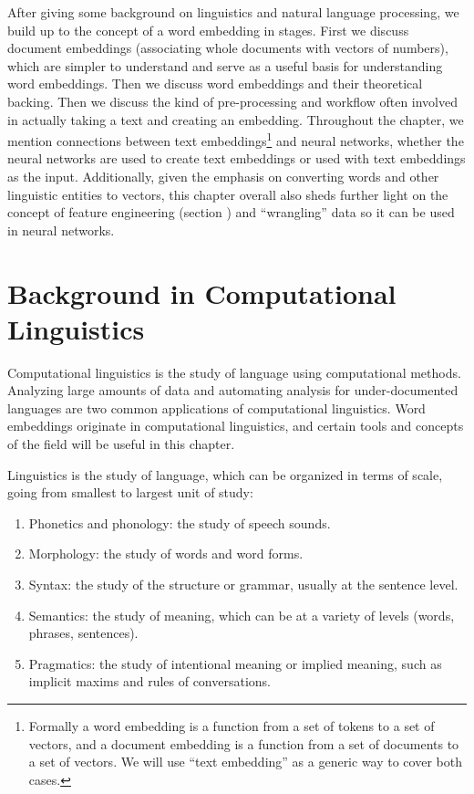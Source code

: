 After giving some background on linguistics and natural language processing, we build up to the concept of a word embedding in stages. First we discuss document embeddings (associating whole documents with vectors of numbers), which are simpler to understand and serve as a useful basis for understanding word embeddings. Then we discuss word embeddings and their theoretical backing.  Then we discuss the kind of pre-processing and workflow often involved in actually taking a text and creating an embedding. Throughout the chapter, we mention connections between text embeddings\footnote{Formally a word embedding is a function from a set of tokens to a set of vectors, and a document embedding is a function from a set of documents to a set of vectors.  We will use ``text embedding'' as a generic way to cover both cases.} and neural networks, whether the neural networks are used to create text embeddings or used with text embeddings as the input.
Additionally, given the emphasis on converting words and other linguistic entities to vectors, this chapter overall also sheds further light on the concept of feature engineering (section ) and ``wrangling'' data so it can be used in neural networks. 

\section{Background in Computational Linguistics}

Computational linguistics is the study of language using computational methods. Analyzing large amounts of data and automating analysis for under-documented languages are two common applications of computational linguistics. Word embeddings originate in computational linguistics, and certain tools and concepts of the field will be useful in this chapter. 

Linguistics is the study of language, which can be organized in terms of scale, going from smallest to largest unit of study: 
\begin{enumerate}
\item Phonetics and phonology: the study of speech sounds.
\item Morphology: the study of words and word forms.
\item Syntax: the study of the structure or grammar, usually at the sentence level.
\item Semantics: the study of meaning, which can be at a variety of levels (words, phrases, sentences).
\item Pragmatics: the study of intentional meaning or implied meaning, such as implicit maxims and rules of conversations. 
\end{enumerate}

